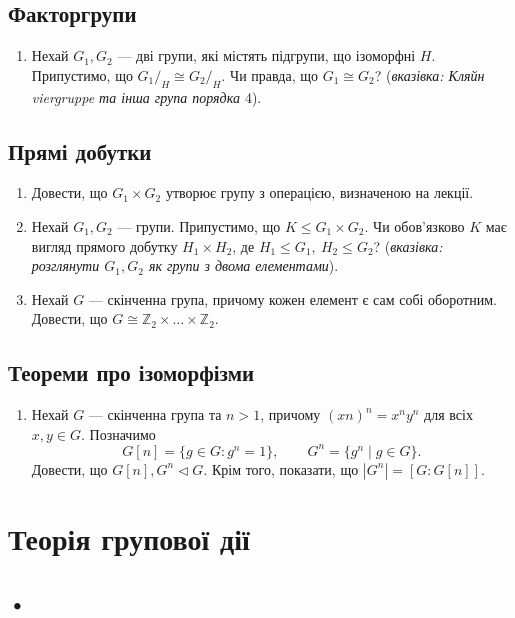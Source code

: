 \documentclass{math_library}
\begin{document}
\subsection{Факторгрупи}
\begin{enumerate}[wide=0pt,label=\thesubsection.\arabic*]
\item Нехай $G_1,G_2$ --- дві групи, які містять підгрупи, що ізоморфні $H$. Припустимо, що $G_1/_H \cong G_2/_H$. Чи правда, що $G_1 \cong G_2$? (\textit{вказівка: Кляйн viergruppe та інша група порядка $4$}).
\end{enumerate}

\subsection{Прямі добутки}
\begin{enumerate}[wide=0pt,label=\thesubsection.\arabic*]
\item Довести, що $G_1 \times G_2$ утворює групу з операцією, визначеною на лекції.

\item Нехай $G_1,G_2$ --- групи. Припустимо, що $K \leq G_1 \times G_2$. Чи обов'язково $K$ має вигляд прямого добутку $H_1 \times H_2$, де $H_1 \leq G_1,\ H_2 \leq G_2$? (\textit{вказівка: розглянути $G_1,G_2$ як групи з двома елементами}).

\item Нехай $G$ --- скінченна група, причому кожен елемент є сам собі оборотним. Довести, що $G \cong \mathbb{Z}_2 \times \dots \times \mathbb{Z}_2$.
\end{enumerate}

\subsection{Теореми про ізоморфізми}
\begin{enumerate}[wide=0pt,label=\thesubsection.\arabic*]
\item Нехай $G$ --- скінченна група та $n > 1$, причому $(xn)^n = x^n y^n$ для всіх $x,y \in G$. Позначимо
\[
G[n] = \{g \in G: g^n = 1\}, \qquad G^n = \{ g^n \mid g \in G\}.
\]
Довести, що $G[n], G^n \triangleleft G$. Крім того, показати, що $|G^n| = [G:G[n]]$.
\end{enumerate}
\newpage

\section{Теорія групової дії}
\subsection{•}
\end{document}
